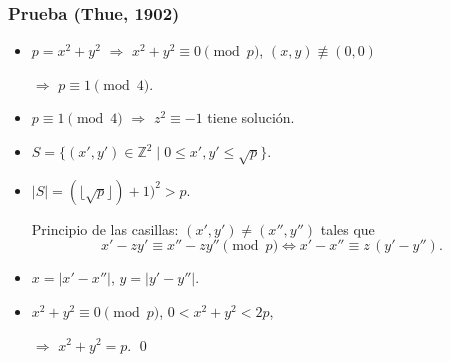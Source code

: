 \documentclass[handout]{beamer}
\newcommand{\ZZ}{\mathbb{Z}}
\begin{document}

\begin{frame}[fragile]
  \frametitle{Prueba (Thue, 1902)}


  \begin{itemize}
  \item<3-> $p = x^2 + y^2$ $\Longrightarrow$ $x^2 + y^2 \equiv 0 \pmod{p}$, $(x,y) \not\equiv (0,0)$

    $\Longrightarrow$ $p \equiv 1 \pmod{4}$.
  \end{itemize}


  \begin{itemize}
  \item<5-> $p \equiv 1 \pmod{4}$ $\Longrightarrow$ $z^2 \equiv -1$ tiene solución.

  \item<6-> $S = \{ (x', y') \in \ZZ^2 \mid 0 \le x', y' \le \sqrt{p} \}$.

  \item<7-> $|S| = (\lfloor \sqrt{p}\rfloor) + 1)^2 > p$.

    Principio de las casillas: $(x',y') \ne (x'', y'')$ tales que
    \[ x' - zy' \equiv x'' - zy'' \pmod{p}
      \iff x' - x'' \equiv z\,(y' - y''). \]

  \item<8-> $x = |x' - x''|$, $y = |y' - y''|$.

  \item<9-> $x^2 + y^2 \equiv 0 \pmod{p}$, $0 < x^2 + y^2 < 2p$,

    $\Longrightarrow$ $x^2 + y^2 = p$. \qed
  \end{itemize}
\end{frame}

\end{document}

